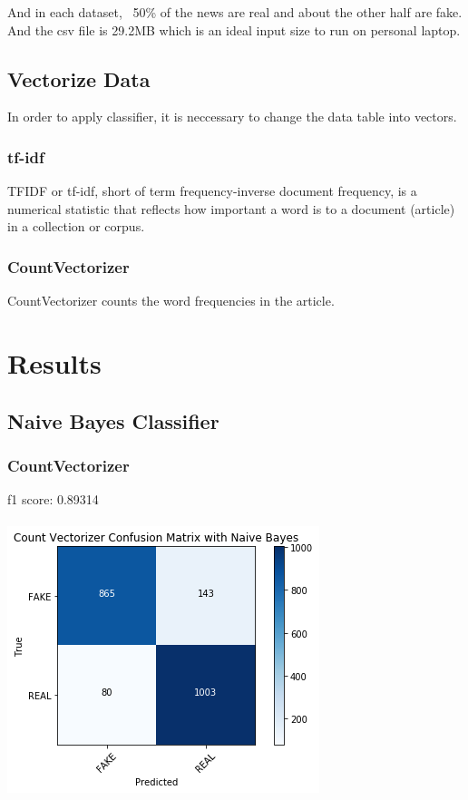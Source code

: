\documentclass[twoside,twocolumn]{article}
\begin{document}
    \noindent And in each dataset,  ~50\% of the news are real and about the 
    other half are fake. And the csv file is 29.2MB which is an ideal input size 
    to run on personal laptop.
    
    \subsection{Vectorize Data}
    In order to apply classifier, it is neccessary to change the data table into vectors.
    \subsubsection{tf-idf}
    TFIDF or tf-idf, short of term frequency-inverse document frequency, is a numerical statistic that reflects
    how important a word is to a document (article) in a collection or corpus.
    \subsubsection{CountVectorizer}
    CountVectorizer counts the word frequencies in the article.

    \section{Results}
    \subsection{Naive Bayes Classifier}
    \subsubsection{CountVectorizer}
    f1 score: 0.89314\\
    \\ \noindent \includegraphics[scale=0.6]{NBC_count.png}
    
\end{document}

